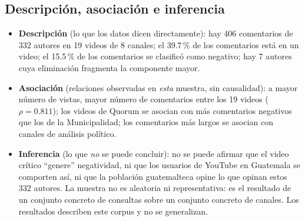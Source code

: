\documentclass[11pt,a4paper]{article}
\begin{document}
\subsection{Descripci\'on, asociaci\'on e inferencia}
\begin{itemize}[leftmargin=1.4em,itemsep=2pt]
\item \textbf{Descripci\'on} (lo que los datos dicen directamente): hay 406 comentarios de 332 autores
en 19 videos de 8 canales; el 39.7\,\% de los comentarios est\'a en un video; el 15.5\,\% de los
comentarios se clasific\'o como negativo; hay 7 autores cuya eliminaci\'on fragmenta la componente
mayor.
\item \textbf{Asociaci\'on} (relaciones observadas en \emph{esta} muestra, sin causalidad): a mayor
n\'umero de vistas, mayor n\'umero de comentarios entre los 19 videos ($\rho=0.811$); los videos de
Quorum se asocian con m\'as comentarios negativos que los de la Municipalidad; los comentarios m\'as
largos se asocian con canales de an\'alisis pol\'itico.
\item \textbf{Inferencia} (lo que \emph{no} se puede concluir): no se puede afirmar que el video
cr\'itico ``genere'' negatividad, ni que los usuarios de YouTube en Guatemala se comporten as\'i, ni
que la poblaci\'on guatemalteca opine lo que opinan estos 332 autores. La muestra no es aleatoria ni
representativa: es el resultado de un conjunto concreto de consultas sobre un conjunto concreto de
canales. Los resultados describen este corpus y no se generalizan.
\end{itemize}
\end{document}

